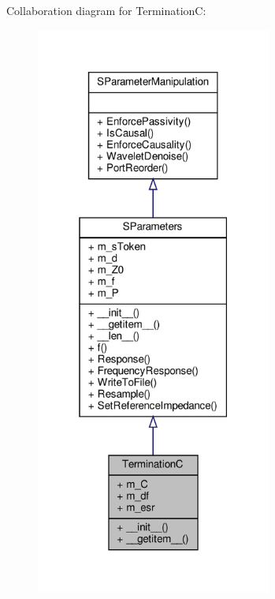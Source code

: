 Collaboration diagram for TerminationC\+:
\nopagebreak
\begin{figure}[H]
\begin{center}
\leavevmode
\includegraphics[width=220pt]{classSignalIntegrity_1_1SParameters_1_1Devices_1_1TerminationC_1_1TerminationC__coll__graph}
\end{center}
\end{figure}

